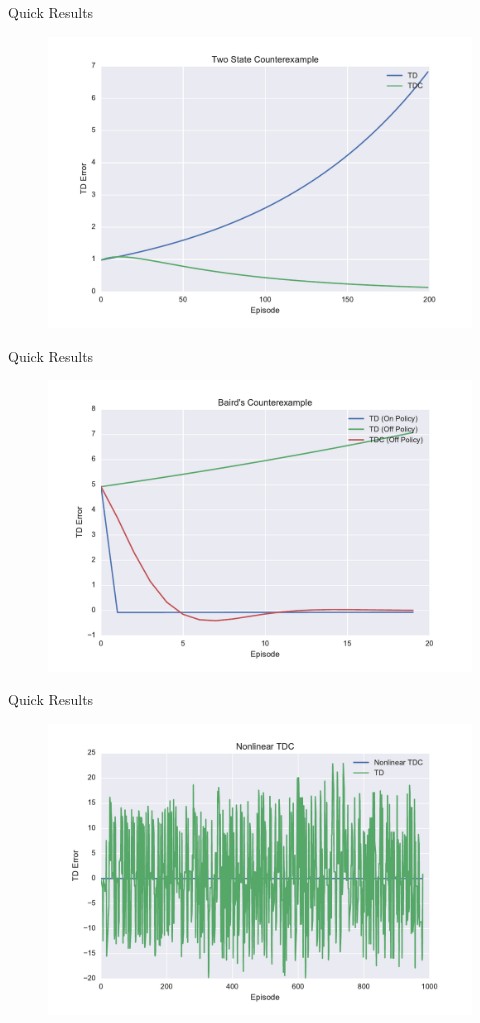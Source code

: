 \documentclass{beamer}
\begin{document}
\begin{frame}{Quick Results}
  \begin{figure}
    \includegraphics[width=0.7\linewidth]{2State.pdf}
  \end{figure}
\end{frame}
\begin{frame}{Quick Results}
  \begin{figure}
    \includegraphics[width=0.7\linewidth]{Baird2.pdf}
  \end{figure}
\end{frame}
\begin{frame}{Quick Results}
  \begin{figure}
    \includegraphics[width=0.7\linewidth]{NonLinTDC.pdf}
  \end{figure}
\end{frame}
\end{document}
